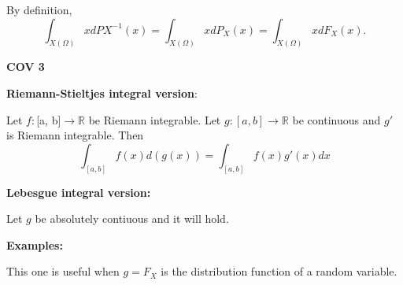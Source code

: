 \documentclass[12pt, reqno]{amsart}
\numberwithin{equation}{section}
\newcommand{\R}{\mathbb{R}}
\begin{document}
By definition,
\[
\int_{X(\Omega)} x dPX^{-1}(x)
= \int_{X(\Omega)} x dP_X(x)
= \int_{X(\Omega)} x dF_X(x).
\]

\textbf{COV 3}

\textbf{Riemann-Stieltjes integral version}:

Let $f : $[a, b]$ \to \R$ be Riemann integrable.
Let $g : [a, b] \to \R$ be continuous and $g'$ is Riemann integrable.
Then
\[
\int_{[a, b]} f(x) d(g(x))
= \int_{[a, b]} f(x) g'(x) dx
\]

\textbf{Lebesgue integral version:}

Let $g$ be absolutely contiuous and it will hold.

\textbf{Examples:}

This one is useful when $g = F_X$ is the distribution function of a random variable.
\end{document}
